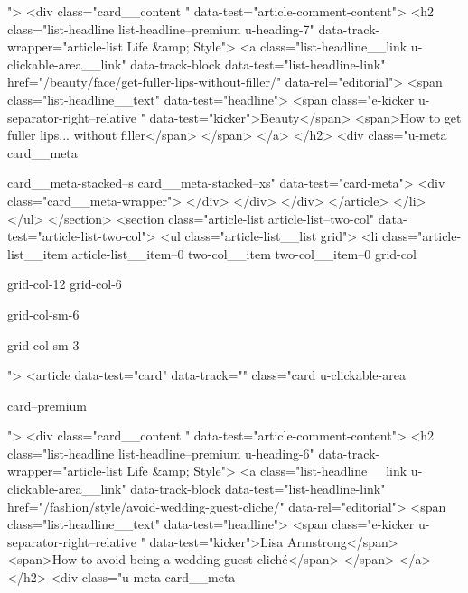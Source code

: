 {{{			 ">
<div class="card__content " data-test="article-comment-content">
<h2 class="list-headline list-headline--premium u-heading-7" data-track-wrapper="article-list Life &amp; Style">
<a class="list-headline__link u-clickable-area__link" data-track-block data-test="list-headline-link" href="/beauty/face/get-fuller-lips-without-filler/" data-rel="editorial">
<span class="list-headline__text" data-test="headline">
<span class="e-kicker u-separator-right--relative " data-test="kicker">Beauty</span>
<span>How to get fuller lips... without filler</span>
</span>
</a>
</h2>
<div class="u-meta card__meta
						
						card__meta-stacked--s
						card__meta-stacked--xs" data-test="card-meta">
<div class="card__meta-wrapper">
</div>
</div>
</div>
</article>
</li>
</ul>
</section>
<section class="article-list article-list--two-col" data-test="article-list-two-col">
<ul class="article-list__list grid">
<li class="article-list__item article-list__item--0 two-col__item two-col__item--0
			grid-col
			
			
			
			grid-col-12
			grid-col-6
			
			grid-col-sm-6
			
			
			
			grid-col-sm-3
			
			
			
			
			
			
			
			
			">
<article data-test="card" data-track="" class="card
			u-clickable-area
			
			
			card--premium
			
			
			
			
			
			 ">
<div class="card__content " data-test="article-comment-content">
<h2 class="list-headline list-headline--premium u-heading-6" data-track-wrapper="article-list Life &amp; Style">
<a class="list-headline__link u-clickable-area__link" data-track-block data-test="list-headline-link" href="/fashion/style/avoid-wedding-guest-cliche/" data-rel="editorial">
<span class="list-headline__text" data-test="headline">
<span class="e-kicker u-separator-right--relative " data-test="kicker">Lisa Armstrong</span>
<span>How to avoid being a wedding guest cliché</span>
</span>
</a>
</h2>
<div class="u-meta card__meta
						
}}}

